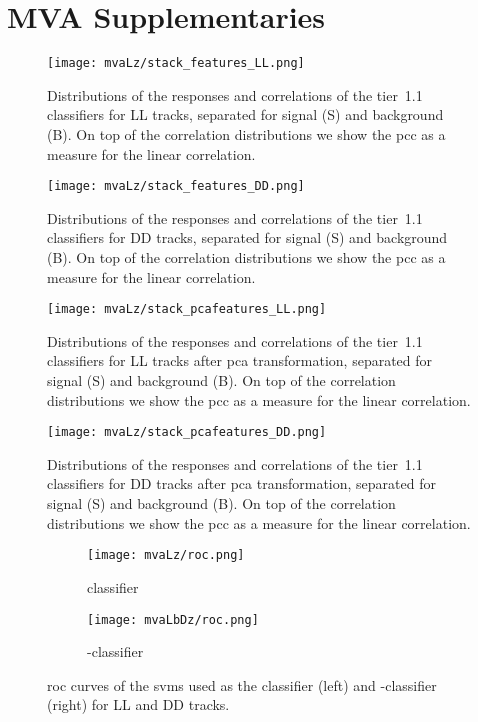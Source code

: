 \chapter{MVA Supplementaries}
\label{chap:apdx_mvasupp}

\begin{figure}[htbp]
    \centering
    \texttt{[image: mvaLz/stack\_features\_LL.png]}
    \caption{Distributions of the responses and correlations of the tier~1.1 \Lz classifiers for \gls{LL} tracks, separated for signal (S) and background (B). On top of the correlation distributions we show the \gls{pcc} as a measure for the linear correlation.}
    \label{fig:mvaLz_stack_features_LL}
\end{figure}

\begin{figure}[htbp]
    \centering
    \texttt{[image: mvaLz/stack\_features\_DD.png]}
    \caption{Distributions of the responses and correlations of the tier~1.1 \Lz classifiers for \gls{DD} tracks, separated for signal (S) and background (B). On top of the correlation distributions we show the \gls{pcc} as a measure for the linear correlation.}
    \label{fig:mvaLz_stack_features_DD}
\end{figure}

\begin{figure}[htbp]
    \centering
    \texttt{[image: mvaLz/stack\_pcafeatures\_LL.png]}
    \caption{Distributions of the responses and correlations of the tier~1.1 \Lz classifiers for \gls{LL} tracks after \gls{pca} transformation, separated for signal (S) and background (B). On top of the correlation distributions we show the \gls{pcc} as a measure for the linear correlation.}
    \label{fig:mvaLz_stack_pcafeatures_LL}
\end{figure}

\begin{figure}[htbp]
    \centering
    \texttt{[image: mvaLz/stack\_pcafeatures\_DD.png]}
    \caption{Distributions of the responses and correlations of the tier~1.1 \Lz classifiers for \gls{DD} tracks after \gls{pca} transformation, separated for signal (S) and background (B). On top of the correlation distributions we show the \gls{pcc} as a measure for the linear correlation.}
    \label{fig:mvaLz_stack_pcafeatures_DD}
\end{figure}

\begin{figure}[htbp]
    \centering
    \begin{subfigure}[b]{.49\textwidth}
        \centering
        \texttt{[image: mvaLz/roc.png]}
        \caption{\Lz classifier}
    \end{subfigure}
    \begin{subfigure}[b]{.49\textwidth}
        \centering
        \texttt{[image: mvaLbDz/roc.png]}
        \caption{\Lb-\Dz classifier}
    \end{subfigure}
    \caption{\Gls{roc} curves of the \glspl{svm} used as the \Lz classifier (left) and \Lb-\Dz classifier (right) for \gls{LL} and \gls{DD} tracks.}
    \label{fig:mvaLzLbDz_roc}
\end{figure}

